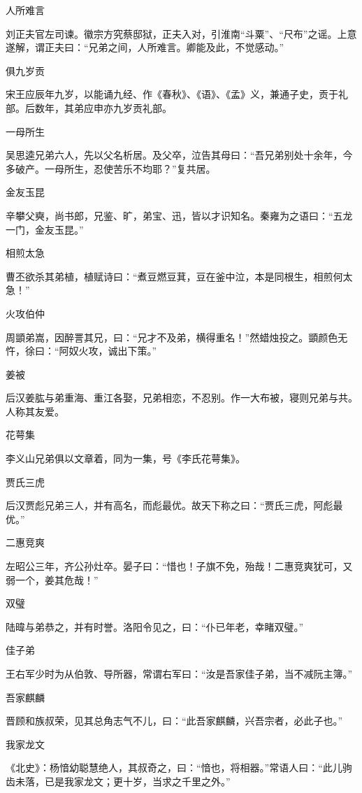 \documentclass[a4paper,12pt,UTF8,twoside]{ctexbook}
\begin{document}
    人所难言
    
    刘正夫官左司谏。徽宗方究蔡邸狱，正夫入对，引淮南“斗粟”、“尺布”之谣。上意遂解，谓正夫曰：“兄弟之间，人所难言。卿能及此，不觉感动。”
    
    俱九岁贡
    
    宋王应辰年九岁，以能诵九经、作《春秋》、《语》、《孟》义，兼通子史，贡于礼部。后数年，其弟应申亦九岁贡礼部。
    
    一母所生
    
    吴思逵兄弟六人，先以父名析居。及父卒，泣告其母曰：“吾兄弟别处十余年，今多破产。一母所生，忍使苦乐不均耶？”复共居。
    
    金友玉昆
    
    辛攀父奭，尚书郎，兄鉴、旷，弟宝、迅，皆以才识知名。秦雍为之语曰：“五龙一门，金友玉昆。”
    
    相煎太急
    
    曹丕欲杀其弟植，植赋诗曰：“煮豆燃豆萁，豆在釜中泣，本是同根生，相煎何太急！”
    
    火攻伯仲
    
    周顗弟嵩，因醉詈其兄，曰：“兄才不及弟，横得重名！”然蜡烛投之。顗颜色无忤，徐曰：“阿奴火攻，诚出下策。”
    
    姜被
    
    后汉姜肱与弟重海、重江各娶，兄弟相恋，不忍别。作一大布被，寝则兄弟与共。人称其友爱。
    
    花萼集
    
    李义山兄弟俱以文章着，同为一集，号《李氏花萼集》。
    
    贾氏三虎
    
    后汉贾彪兄弟三人，并有高名，而彪最优。故天下称之曰：“贾氏三虎，阿彪最优。”
    
    二惠竞爽
    
    左昭公三年，齐公孙灶卒。晏子曰：“惜也！子旗不免，殆哉！二惠竞爽犹可，又弱一个，姜其危哉！”
    
    双璧
    
    陆暐与弟恭之，并有时誉。洛阳令见之，曰：“仆已年老，幸睹双璧。”
    
    佳子弟
    
    王右军少时为从伯敦、导所器，常谓右军曰：“汝是吾家佳子弟，当不减阮主簿。”
    
    吾家麒麟
    
    晋顾和族叔荣，见其总角志气不儿，曰：“此吾家麒麟，兴吾宗者，必此子也。”
    
    我家龙文
    
    《北史》：杨愔幼聪慧绝人，其叔奇之，曰：“愔也，将相器。”常语人曰：“此儿驹齿未落，已是我家龙文；更十岁，当求之千里之外。”
    
\end{document}
